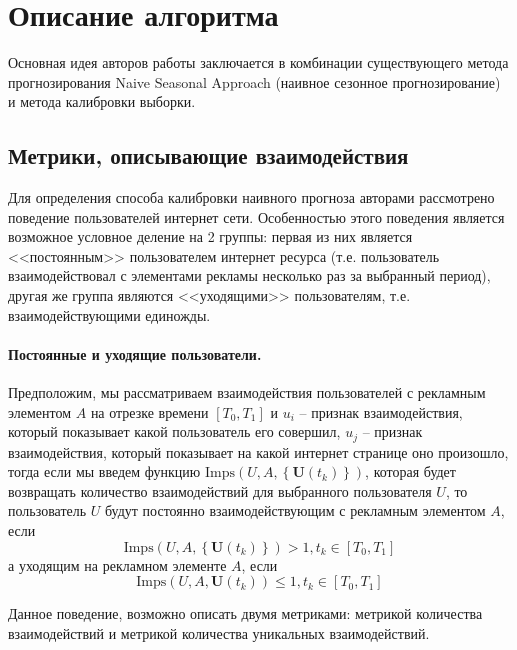 \section{Описание алгоритма}
    
    Основная идея авторов работы заключается в комбинации существующего метода прогнозирования
    Naive Seasonal Approach (наивное сезонное прогнозирование) и метода калибровки выборки.

\subsection{Метрики, описывающие взаимодействия}

    Для определения способа калибровки наивного прогноза авторами рассмотрено поведение пользователей интернет сети.
    Особенностью этого поведения является возможное условное деление на 2 группы: первая из них является <<постоянным>>
    пользователем интернет ресурса (т.е. пользователь взаимодействовал с элементами рекламы несколько раз за выбранный
    период), другая же группа являются <<уходящими>> пользователям, т.е. взаимодействующими единожды.

    \paragraph{Постоянные и уходящие пользователи.} Предположим, мы рассматриваем взаимодействия пользователей с
    рекламным элементом $A$ на отрезке времени $\left[ T_0, T_1 \right]$ и $u_i$ -- признак взаимодействия,
    который показывает какой пользователь его совершил, $u_j$ -- признак взаимодействия, который показывает на какой
    интернет странице оно произошло, тогда если мы введем функцию 
    $\text{Imps}\left(U, A, \left\{\mathbf{U}\left(t_k\right)\right\}\right)$, 
    которая будет возвращать количество взаимодействий для выбранного пользователя $U$, то пользователь $U$ 
    будут постоянно взаимодействующим с рекламным элементом $A$, если
    \begin{equation}
        \text{Imps}\left(U, A, \left\{\mathbf{U}\left(t_k\right)\right\}\right) > 1, t_k \in \left[ T_0, T_1 \right]
    \end{equation}
    а уходящим на рекламном элементе $A$, если
    \begin{equation}
        \text{Imps}\left(U, A, \mathbf{U}\left(t_k\right)\right) \leq 1, t_k \in \left[ T_0, T_1 \right]
    \end{equation}

    Данное поведение, возможно описать двумя метриками: метрикой количества взаимодействий и
    метрикой количества уникальных взаимодействий.


